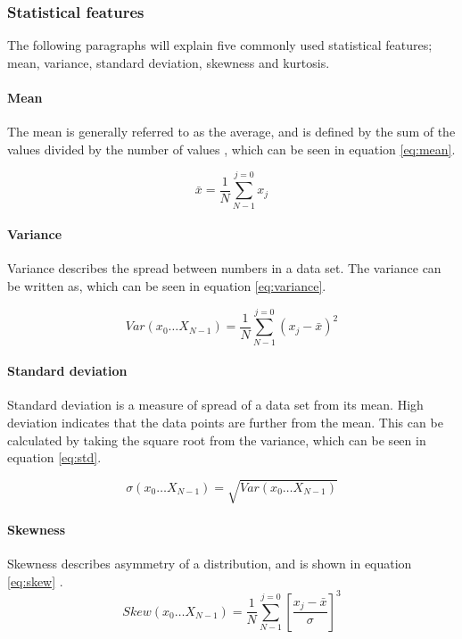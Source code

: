 \documentclass[USenglish]{ifimaster}  %
\begin{document}
\subsubsection{Statistical features} \label{sub:statical}
The following paragraphs will explain five commonly used statistical features; mean, variance, standard deviation, skewness and kurtosis.
	
\paragraph{Mean}
The mean is generally referred to as the average, and is defined by the sum of the values divided by the number of values \cite{Press:2007:NRE:1403886}, which can be seen in equation \ref{eq:mean}.
	
\begin{equation}
\bar{x} = \frac{1}{N}\sum_{N-1}^{j=0}x_{j}
\label{eq:mean}
\end{equation}
	
	
\paragraph{Variance}
Variance describes the spread between numbers in a data set. The variance can be written as\cite{Press:2007:NRE:1403886}, which can be seen in equation \ref{eq:variance}.
	
	\begin{equation}
	Var(x_0\dotsc X_{N-1})  = \frac{1}{N}\sum_{N-1}^{j=0}(x_{j}-\bar{x})^2
	\label{eq:variance}
	\end{equation}

\paragraph{Standard deviation}
Standard deviation is a measure of spread of a data set from its mean. High deviation indicates that the data points are further from the mean. This can be calculated by taking the square root from the variance\cite{Press:2007:NRE:1403886}, which can be seen in equation \ref{eq:std}.
	
	\begin{equation}
	\sigma(x_0\dotsc X_{N-1})  = \sqrt{Var(x_0\dotsc X_{N-1})}
	\label{eq:std}
	\end{equation}
	
\paragraph{Skewness} 
Skewness describes asymmetry of a distribution, and is shown in equation \ref{eq:skew} \cite{Press:2007:NRE:1403886}.
	\begin{equation}
	Skew(x_0\dotsc X_{N-1})  =  \frac{1}{N}\sum_{N-1}^{j=0}\left [ \frac{x_j-\bar{x}}{\sigma} \right ]^3
	\label{eq:skew}
	\end{equation}
	
\end{document}
